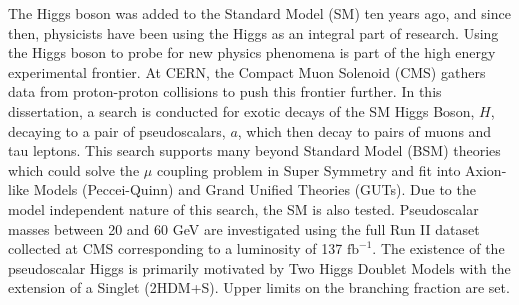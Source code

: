The Higgs boson was added to the Standard Model (SM) ten years ago, and since then, physicists have been using the Higgs as an integral part of research.  
Using the Higgs boson to probe for new physics phenomena is part of the high energy experimental frontier. 
At CERN, the Compact Muon Solenoid (CMS) gathers data from proton-proton collisions to push this frontier further. 
In this dissertation, a search is conducted for exotic decays of the SM Higgs Boson, $H$, decaying to a pair of pseudoscalars, $a$, which then decay to pairs of muons and tau leptons. 
This search supports many beyond Standard Model (BSM) theories which could solve the $\mu$ coupling problem in Super Symmetry and fit into Axion-like Models (Peccei-Quinn) and Grand Unified Theories (GUTs). 
Due to the model independent nature of this search, the SM is also tested. 
Pseudoscalar masses between 20 and 60 GeV are investigated using the full Run II dataset collected at CMS corresponding to a luminosity of 137 $\text{fb}^{-1}$. The existence of the pseudoscalar Higgs is primarily motivated by Two Higgs Doublet Models with the extension of a Singlet (2HDM+S). Upper limits on the branching fraction are set.
